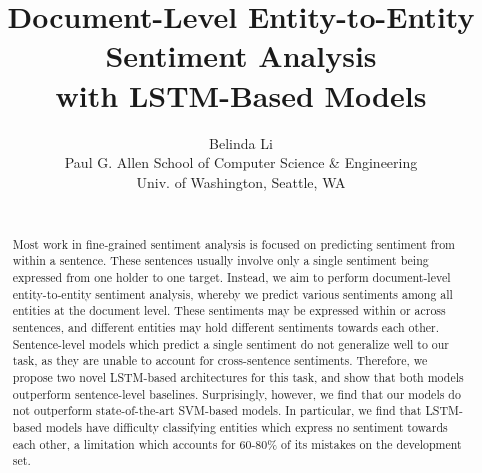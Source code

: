\documentclass[11pt,a4paper]{article}
\title{Document-Level Entity-to-Entity Sentiment Analysis \\ with LSTM-Based Models}
\author{Belinda Li \\
  Paul G. Allen School of Computer Science \& Engineering \\
  Univ. of Washington, Seattle, WA \\
  \\}
\date{}
\begin{document}
\maketitle
\begin{abstract}
  Most work in fine-grained sentiment analysis is focused on predicting sentiment from within a sentence.
  These sentences usually involve only a single sentiment being expressed from one holder to one target.
  Instead, we aim to perform document-level entity-to-entity sentiment analysis, whereby we predict various sentiments among all entities at the document level.
  These sentiments may be expressed within or across sentences, and different entities may hold different sentiments towards each other.
  Sentence-level models which predict a single sentiment do not generalize well to our task, as they are unable to account for cross-sentence sentiments.
  Therefore, we propose two novel LSTM-based architectures for this task, and show that both models outperform sentence-level baselines.
  Surprisingly, however, we find that our models do not outperform state-of-the-art SVM-based models.
  In particular, we find that LSTM-based models have difficulty classifying entities which express no sentiment towards each other, a limitation which accounts for 60-80\% of its mistakes on the development set.
\end{abstract}
\end{document}
